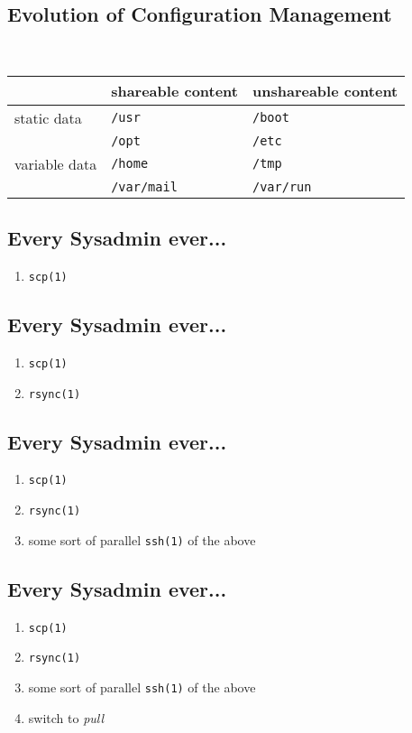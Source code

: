 \documentclass[xga]{xdvislides}
\begin{document}
\subsection{Evolution of Configuration Management}
\\

\vspace{.5in}
\Huge
        \begin{tabular}{ l | l | l }
        & shareable content & unshareable content \\
        \hline
        static data & {\tt /usr} & {\tt /boot} \\
        & {\tt /opt} & {\tt /etc} \\
        \hline
        variable data & {\tt /home} & {\tt /tmp} \\
        & {\tt /var/mail} & {\tt /var/run} \\
        \hline
        \end{tabular}
\Normalsize

\subsection{Every Sysadmin ever...}
\begin{enumerate}
	\item {\tt scp(1)}
\end{enumerate}

\subsection{Every Sysadmin ever...}
\begin{enumerate}
	\item {\tt scp(1)}
	\item {\tt rsync(1)}
\end{enumerate}

\subsection{Every Sysadmin ever...}
\begin{enumerate}
	\item {\tt scp(1)}
	\item {\tt rsync(1)}
	\item some sort of parallel {\tt ssh(1)} of the above
\end{enumerate}

\subsection{Every Sysadmin ever...}
\begin{enumerate}
	\item {\tt scp(1)}
	\item {\tt rsync(1)}
	\item some sort of parallel {\tt ssh(1)} of the above
	\item switch to {\em pull}
\end{enumerate}
\end{document}
